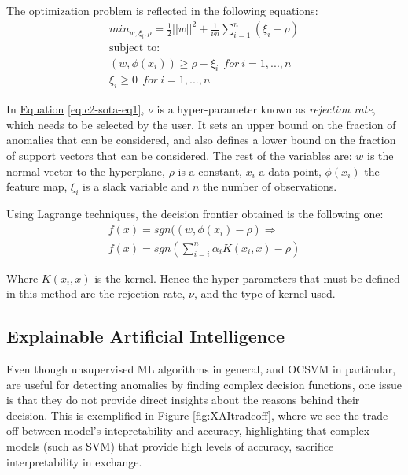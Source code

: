 The optimization problem is reflected in the following equations:
\begin{equation}\label{eq:c2-sota-eq1}
\begin{split}
  min_{w, \xi_i, \rho} = \frac{1}{2} ||w||^2 + \frac{1}{\nu n}\sum_{i=1}^{n}(\xi_i - \rho) \\
  \text{subject to:}\\
  (w, \phi(x_i)) \geq \rho - \xi_i\:\:for\:i = 1,...,n  \\
  \xi_i \geq 0\:\:for\:i = 1,...,n
\end{split}
\end{equation}

In \hyperref[eq:c2-sota-eq1]{Equation} \ref{eq:c2-sota-eq1}, $\nu$ is a hyper-parameter known as \textit{rejection rate}, which needs to be selected by the user. It sets an upper bound on the fraction of anomalies that can be considered, and also defines a lower bound on the fraction of support vectors that can be considered. The rest of the variables are: $w$ is the normal vector to the hyperplane, $\rho$ is a constant, $x_i$ a data point, $\phi(x_i)$ the feature map, $\xi_i$ is a slack variable and $n$ the number of observations.

Using Lagrange techniques, the decision frontier obtained is the following one:
\begin{equation} \label{eq:ch2-sota-eq2}
\begin{split}
f(x) = sgn((w, \phi(x_i) - \rho) \Rightarrow \\
f(x) = sgn(\sum_{i=i}^{n}\alpha_i K(x_i,x) - \rho)
\end{split}
\end{equation}

Where $K(x_i,x)$ is the kernel. Hence the hyper-parameters that must be defined in this method are the rejection rate, $\nu$, and the type of kernel used. 

\subsection{Explainable Artificial Intelligence}\label{subsec:ch2-sota-intro-xai}
Even though unsupervised ML algorithms in general, and OCSVM in particular, are useful for detecting anomalies by finding complex decision functions, one issue is that they do not provide direct insights about the reasons behind their decision. This is exemplified in  \hyperref[fig:XAItradeoff]{Figure} \ref{fig:XAItradeoff}, where we see the trade-off between model's intepretability and accuracy, highlighting that complex models (such as SVM) that provide high levels of accuracy, sacrifice interpretability in exchange. 

